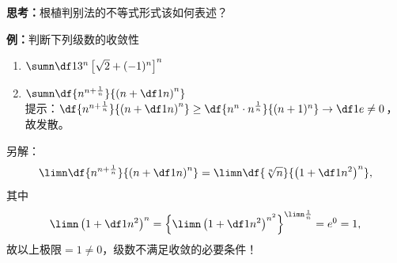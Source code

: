 
{\bf 思考：}根植判别法的不等式形式该如何表述？

{\bf 例：}判断下列级数的收敛性
\begin{enumerate} [(1)]
  \setlength{\itemindent}{1cm}
  \item $\sumn\df1{3^n}\left[\sqrt2+(-1)^n\right]^n$
  \item $\sumn\df{n^{n+\frac1n}}{\left(n+\df1n\right)^n}$\\
  提示：$\df{n^{n+\frac1n}}{\left(n+\df1n\right)^n}\geq\df{n^n\cdot
  n^{\frac1n}}{(n+1)^n}\to\df1e\ne0$，故发散。
\end{enumerate}

另解：
$$\limn\df{n^{n+\frac1n}}{\left(n+\df1n\right)^n}
=\limn\df{\sqrt[n]n}{\left(1+\df1{n^2}\right)^n},$$
其中
$$\limn\left(1+\df1{n^2}\right)^n=
\left\{\limn\left(1+\df1{n^2}\right)^{n^2}\right\}^{\limn\frac1n}=e^0=1,$$
故以上极限$=1\ne0$，级数不满足收敛的必要条件！

